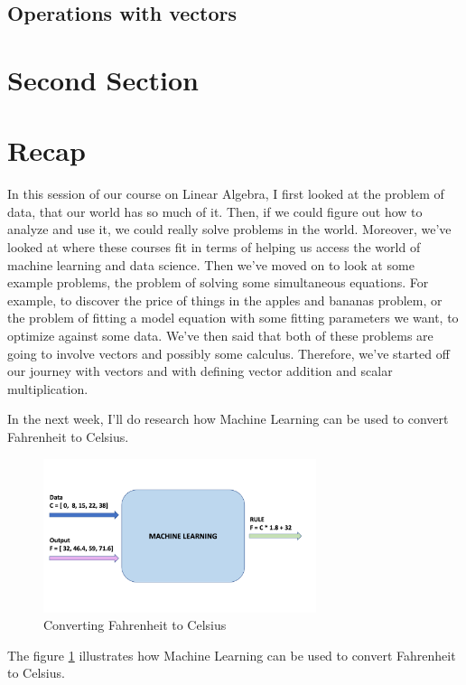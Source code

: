 \documentclass{article}
\begin{document}
\subsection{Operations with vectors}

\section{Second Section}

\section{Recap}

In this session of our course on Linear Algebra, I first looked at the problem of data, that our world has so much of it.
Then, if we could figure out how to analyze and use it, we could really solve problems in the world.
Moreover, we've looked at where these courses fit in terms of helping us access the world of machine learning and data science.
Then we've moved on to look at some example problems, the problem of solving some simultaneous equations. For example, to discover the price of things in the apples and bananas problem, or the problem of fitting a model equation with some fitting parameters we want, to optimize against some data.
We've then said that both of these problems are going to involve vectors and possibly some calculus. Therefore, we've started off our journey with vectors and with defining vector addition and scalar multiplication.

In the next week, I'll do research how Machine Learning can be used to convert Fahrenheit to Celsius.

\begin{figure}[h]
\centering
\includegraphics[width=8cm]{tensorflow-l2f1}
\caption{Converting Fahrenheit to Celsius}
\label{fig:F2C}
\end{figure}

The figure \ref{fig:F2C} illustrates how Machine Learning can be used to convert Fahrenheit to Celsius.

\nocite{*}

\printbibliography
\end{document}
